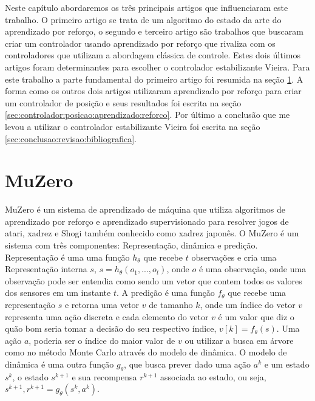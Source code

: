 
\label{Cap:TrabalhosRelacionados}
Neste capítulo abordaremos os três principais artigos que influenciaram
este trabalho. O primeiro artigo se trata de um algoritmo do estado
da arte do aprendizado por reforço, o segundo e terceiro artigo são
trabalhos que buscaram criar um controlador usando aprendizado por reforço
que rivaliza com os controladores que utilizam a abordagem clássica de controle.
Estes dois últimos artigos foram determinantes para escolher o controlador
estabilizante Vieira. Para este trabalho a parte fundamental do primeiro artigo
foi resumida na seção \ref{sec:muzero}. A forma como os outros dois artigos
utilizaram aprendizado por reforço para criar um controlador de posição e seus
resultados foi escrita na seção \ref{sec:controlador:posicao:aprendizado:reforco}.
Por último a conclusão que me levou a utilizar o controlador estabilizante Vieira
foi escrita na seção \ref{sec:conclusao:revisao:bibliografica}.

\section{MuZero}
\label{sec:muzero}

MuZero é um sistema de aprendizado de máquina que utiliza algoritmos de
aprendizado por reforço e aprendizado supervisionado para
resolver jogos de atari, xadrez e Shogi também conhecido como
xadrez japonês. O MuZero é um sistema com três componentes:
Representação, dinâmica e predição. Representação é uma uma
função $h_{\theta}$  que recebe $t$ observações 
e cria uma Representação interna $s$, $s = h_{\theta}(o_1,...,o_t)$,
onde $o$ é uma observação, onde uma observação pode ser entendia como sendo
um vetor que contem todos os valores dos sensores em um instante $t$.
A predição é uma função $f_{\theta}$ que recebe uma representação $s$
e retorna uma vetor $v$ de tamanho $k$, onde um índice do vetor $v$ representa
uma ação discreta e cada elemento do vetor $v$ é um valor que diz o quão bom
seria tomar a decisão do seu respectivo índice,  $v[k] =  f_{\theta}(s)$.
Uma ação $a$, poderia ser o índice do maior
valor de $v$ ou utilizar a busca em árvore como no método Monte Carlo
através do modelo de dinâmica. O modelo de dinâmica é uma outra função
$g_{\theta}$, que busca prever dado uma ação $a^k$ e um estado $s^{k}$,
o estado $s^{k+1}$ e sua recompensa $r^{k+1}$ associada ao estado,
ou seja, $s^{k+1},r^{k+1}=  g_{\theta}(s^{k},a^k)$.


